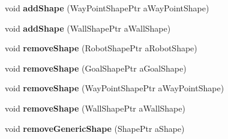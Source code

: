 \begin{DoxyCompactItemize}
\item 
void {\bfseries add\+Shape} (Way\+Point\+Shape\+Ptr a\+Way\+Point\+Shape)\hypertarget{class_view_1_1_robot_world_canvas_abb5dee13a6e25baf0980129cfb1780d3}{}\label{class_view_1_1_robot_world_canvas_abb5dee13a6e25baf0980129cfb1780d3}

\item 
void {\bfseries add\+Shape} (Wall\+Shape\+Ptr a\+Wall\+Shape)\hypertarget{class_view_1_1_robot_world_canvas_a51c5fac3c75b4ebc258511bf00c93863}{}\label{class_view_1_1_robot_world_canvas_a51c5fac3c75b4ebc258511bf00c93863}

\item 
void {\bfseries remove\+Shape} (Robot\+Shape\+Ptr a\+Robot\+Shape)\hypertarget{class_view_1_1_robot_world_canvas_ac40c2e62c75618d63e09a0d4f0ca4bb4}{}\label{class_view_1_1_robot_world_canvas_ac40c2e62c75618d63e09a0d4f0ca4bb4}

\item 
void {\bfseries remove\+Shape} (Goal\+Shape\+Ptr a\+Goal\+Shape)\hypertarget{class_view_1_1_robot_world_canvas_a274b8ff8d7d6bfe6e40c04cbd1c526de}{}\label{class_view_1_1_robot_world_canvas_a274b8ff8d7d6bfe6e40c04cbd1c526de}

\item 
void {\bfseries remove\+Shape} (Way\+Point\+Shape\+Ptr a\+Way\+Point\+Shape)\hypertarget{class_view_1_1_robot_world_canvas_ae94d4410e1250dfc2c2221265be10c24}{}\label{class_view_1_1_robot_world_canvas_ae94d4410e1250dfc2c2221265be10c24}

\item 
void {\bfseries remove\+Shape} (Wall\+Shape\+Ptr a\+Wall\+Shape)\hypertarget{class_view_1_1_robot_world_canvas_a14bd783613cbd6aa65eaabfe873d7369}{}\label{class_view_1_1_robot_world_canvas_a14bd783613cbd6aa65eaabfe873d7369}

\item 
void {\bfseries remove\+Generic\+Shape} (Shape\+Ptr a\+Shape)\hypertarget{class_view_1_1_robot_world_canvas_af3ba30c00eaedf7bbb67b731f12d1af7}{}\label{class_view_1_1_robot_world_canvas_af3ba30c00eaedf7bbb67b731f12d1af7}

\end{DoxyCompactItemize}

